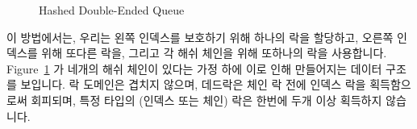 \fi

\begin{figure}[tb]
\centering
{}
\caption{Hashed Double-Ended Queue}
\label{fig:SMPdesign:Hashed Double-Ended Queue}
\end{figure}

이 방법에서는, 우리는 왼쪽 인덱스를 보호하기 위해 하나의 락을 할당하고, 오른쪽
인덱스를 위해 또다른 락을, 그리고 각 해쉬 체인을 위해 또하나의 락을 사용합니다.
Figure~\ref{fig:SMPdesign:Hashed Double-Ended Queue} 가 네개의 해쉬 체인이
있다는 가정 하에 이로 인해 만들어지는 데이터 구조를 보입니다.
락 도메인은 겹치지 않으며, 데드락은 체인 락 전에 인덱스 락을 획득함으로써
회피되며, 특정 타입의 (인덱스 또는 체인) 락은 한번에 두개 이상 획득하지
않습니다.

